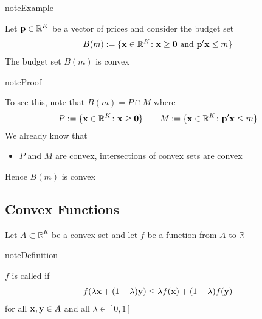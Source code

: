 \documentclass[letterpaper,10pt,english]{jupyterBook}
\begin{document}
\begin{sphinxadmonition}{note}{Example}

\sphinxAtStartPar
Let \({\bf p} \in \mathbb{R}^K\) be a vector of prices and consider the budget set
\begin{equation*}
\begin{split}
%
B(m) := \{ {\bf x} \in \mathbb{R}^K \colon {\bf x } \geq {\bf 0} \text{ and }
{\bf p}' {\bf x} \leq m\}
%
\end{split}
\end{equation*}
\sphinxAtStartPar
The budget set \(B(m)\) is convex
\end{sphinxadmonition}

\begin{sphinxadmonition}{note}{Proof}

\sphinxAtStartPar
To see this, note that \(B(m) = P \cap M\) where
\begin{equation*}
\begin{split}
%
P := \{ {\bf x} \in \mathbb{R}^K \colon {\bf x } \geq {\bf 0} \}
\qquad
M := \{ {\bf x} \in \mathbb{R}^K \colon {\bf p }' {\bf x} \leq m\}
%
\end{split}
\end{equation*}
\sphinxAtStartPar
We already know that
\begin{itemize}
\item {} 
\sphinxAtStartPar
\(P\) and \(M\) are convex, intersections of convex sets are convex

\end{itemize}

\sphinxAtStartPar
Hence \(B(m)\) is convex
\end{sphinxadmonition}


\subsection{Convex Functions}
\label{\detokenize{06.optimization_fundamentals:convex-functions}}
\sphinxAtStartPar
Let \(A \subset \mathbb{R}^K\) be a convex set and let \(f\) be a function from \(A\) to \(\mathbb{R}\)

\begin{sphinxadmonition}{note}{Definition}

\sphinxAtStartPar
\(f\) is called  if
\begin{equation*}
\begin{split}
%
f(\lambda {\bf x} + (1 - \lambda) {\bf y})
\leq \lambda f({\bf x}) + (1 - \lambda) f({\bf y})
%
\end{split}
\end{equation*}
\sphinxAtStartPar
for all \({\bf x}, {\bf y} \in A\) and all \(\lambda \in [0, 1]\)
\end{sphinxadmonition}
\end{document}
